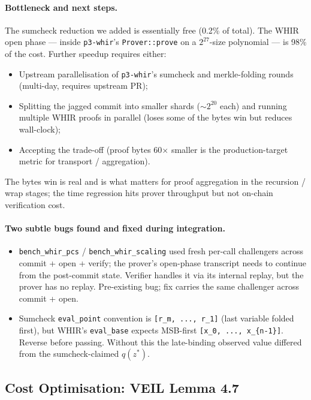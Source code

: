 \paragraph{Bottleneck and next steps.}
The sumcheck reduction we added is essentially free (0.2\% of total).
The WHIR open phase --- inside \texttt{p3-whir}'s \texttt{Prover::prove}
on a $2^{27}$-size polynomial --- is 98\% of the cost.  Further
speedup requires either:
\begin{itemize}
  \item Upstream parallelisation of \texttt{p3-whir}'s sumcheck and
        merkle-folding rounds (multi-day, requires upstream PR);
  \item Splitting the jagged commit into smaller shards
        ($\sim 2^{20}$ each) and running multiple WHIR proofs in
        parallel (loses some of the bytes win but reduces
        wall-clock);
  \item Accepting the trade-off (proof bytes 60$\times$ smaller is the
        production-target metric for transport / aggregation).
\end{itemize}
The bytes win is real and is what matters for proof aggregation in
the recursion / wrap stages; the time regression hits prover
throughput but not on-chain verification cost.

\paragraph{Two subtle bugs found and fixed during integration.}
\begin{itemize}
  \item \texttt{bench\_whir\_pcs} / \texttt{bench\_whir\_scaling}
        used fresh per-call challengers across commit + open + verify;
        the prover's open-phase transcript needs to continue from the
        post-commit state.  Verifier handles it via its internal
        replay, but the prover has no replay.  Pre-existing bug; fix
        carries the same challenger across commit + open.
  \item Sumcheck \texttt{eval\_point} convention is
        \texttt{[r\_m, ..., r\_1]} (last variable folded first), but
        WHIR's \texttt{eval\_base} expects MSB-first
        \texttt{[x\_0, ..., x\_\{n-1\}]}.  Reverse before passing.
        Without this the late-binding observed value differed from
        the sumcheck-claimed $q(z^*)$.
\end{itemize}

\subsection{Cost Optimisation: VEIL Lemma 4.7}

